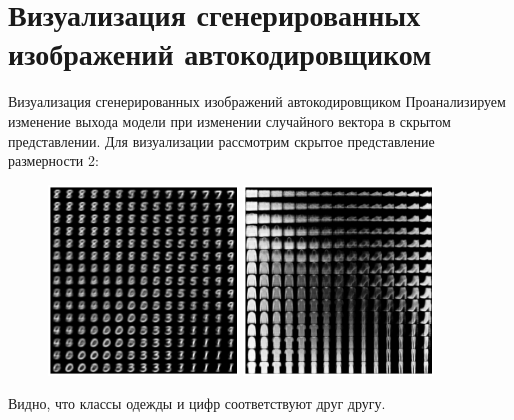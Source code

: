 \documentclass[10pt,pdf,hyperref={unicode}]{beamer}
\begin{document}
\section{Визуализация сгенерированных изображений автокодировщиком}
\begin{frame}{Визуализация сгенерированных изображений автокодировщиком}
\justifying
Проанализируем изменение выхода модели при изменении случайного вектора в скрытом представлении. Для визуализации рассмотрим скрытое представление размерности 2:


\begin{figure}[h!]
\includegraphics[width=0.45\textwidth]{results/decoder_digits.png}
\includegraphics[width=0.45\textwidth]{results/decoder_fashion.png}
\end{figure}

Видно, что классы одежды и цифр соответствуют друг другу.

\end{frame}

\end{document}
